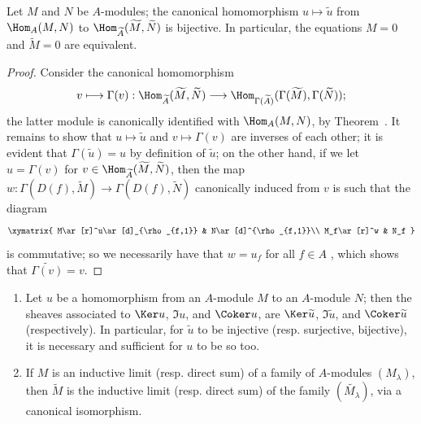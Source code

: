 \begin{corollary}[1.3.8]
\label{I.1.3.8}
Let $M$ and $N$ be $A$-modules;
the canonical homomorphism $u\mapsto\widetilde{u}$ from $\Hom_A(M,N)$ to $\Hom_{\widetilde{A}}(\widetilde{M},\widetilde{N})$ is bijective.
In particular, the equations $M=0$ and $\widetilde{M}=0$ are equivalent.
\end{corollary}

\begin{proof}
Consider the canonical homomorphism
\[
  v\longmapsto\Gamma(v):
  \Hom_{\widetilde{A}}(\widetilde{M},\widetilde{N})
  \longrightarrow
  \Hom_{\Gamma(\widetilde{A})}(\Gamma(\widetilde{M}),\Gamma(\widetilde{N}));
\]
the latter module is canonically identified with $\Hom_A(M,N)$, by Theorem~.
It remains to show that $u\mapsto\widetilde{u}$ and $v\mapsto\Gamma(v)$ are inverses of each other;
it is evident that $\Gamma(\widetilde{u})=u$ by definition of $\widetilde{u}$;
on the other hand, if we let $u=\Gamma(v)$ for $v\in\Hom_{\widetilde{A}}(\widetilde{M},\widetilde{N})$, then the map $w:\Gamma(D(f),\widetilde{M})\to\Gamma(D(f),\widetilde{N})$ canonically induced from $v$ is such that the diagram
\[
  \xymatrix{
    M\ar[r]^u\ar[d]_{\rho_{f,1}} & N\ar[d]^{\rho_{f,1}}\\
    M_f\ar[r]^w & N_f
  }
\]
is commutative;
so we necessarily have that $w=u_f$ for all $f\in A$ , which shows that $\widetilde{\Gamma(v)}=v$.
\end{proof}

\begin{corollary}[1.3.9]
\label{I.1.3.9}
\medskip\noindent
\begin{enumerate}
  \item[{\rm(i)}] Let $u$ be a homomorphism from an $A$-module $M$ to an $A$-module $N$;
    then the sheaves associated to $\Ker u$, $\Im u$, and $\Coker u$, are $\Ker\widetilde{u}$, $\Im\widetilde{u}$, and $\Coker\widetilde{u}$ (respectively).
    In particular, for $\widetilde{u}$ to be injective (resp. surjective, bijective), it is necessary and sufficient for $u$ to be so too.
  \item[{\rm(ii)}] If $M$ is an inductive limit (resp. direct sum) of a family of $A$-modules $(M_\lambda)$, then $\widetilde{M}$ is the inductive limit (resp. direct sum) of the family $(\widetilde{M_\lambda})$, via a canonical isomorphism.
\end{enumerate}
\end{corollary}


